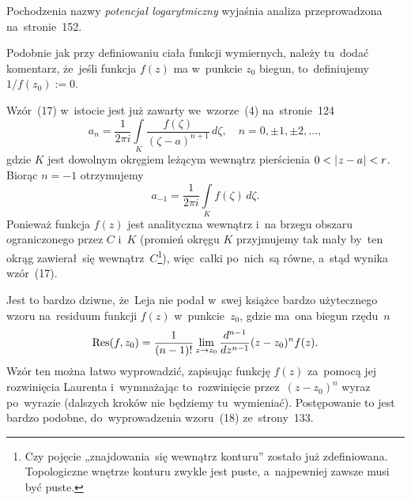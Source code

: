 \documentclass[a4paper,11pt]{article}
\numberwithin{equation}{section}
\begin{document}
\noindent
{} Pochodzenia nazwy \textit{potencjał logarytmiczny} wyjaśnia
analiza przeprowadzona na~stronie~152.

\VerSpaceFour





\noindent
{} Podobnie jak przy definiowaniu ciała funkcji wymiernych, należy
tu~dodać komentarz, że~jeśli funkcja $f( z )$ ma w~punkcie $z_{ 0 }$
biegun, to~definiujemy $1 / f( z_{ 0 } ) := 0$.

\VerSpaceFour





\noindent
{} Wzór~(17) w~istocie jest już zawarty we~wzorze~(4) na~stronie~124
\begin{equation}
  \label{eq:Leja-Funkcje-zespolone-46}
  a_{ n } =
  \frac{ 1 }{ 2\pi i }
  \int\limits_{ K } \frac{ f( \zeta ) }{ ( \zeta - a )^{ n + 1 } } \, d\zeta,
  \quad n = 0, \pm 1, \pm 2, \ldots,
\end{equation}
gdzie $K$ jest dowolnym okręgiem leżącym wewnątrz pierścienia
$0 < | \hspace{0.05em}  z - a  \hspace{0.05em} | < r$. Biorąc $n = -1$ otrzymujemy
\begin{equation}
  \label{eq:Leja-Funkcje-zespolone-47}
  a_{ -1 } = \frac{ 1 }{ 2\pi i } \int\limits_{ K } f( \zeta ) \, d\zeta.
\end{equation}
Ponieważ funkcja $f( z )$ jest analityczna wewnątrz i~na brzegu
obszaru ograniczonego przez $C$ i~$K$ (promień okręgu $K$ przyjmujemy
tak mały by~ten okrąg zawierał~się wewnątrz~$C$\footnote{Czy pojęcie
  „znajdowania~się wewnątrz konturu” zostało już zdefiniowana.
  Topologiczne wnętrze konturu zwykle jest puste, a~najpewniej zawsze
  musi być puste.}), więc~całki po~nich~są równe, a~stąd wynika
wzór~(17).

\VerSpaceFour





\noindent
{} Jest to bardzo dziwne, że~Leja nie podał w~swej książce bardzo
użytecznego wzoru na~residuum funkcji $f( z )$ w~punkcie~$z_{ 0 }$, gdzie
ma~ona biegun rzędu~$n$
\begin{equation}
  \label{eq:Leja-Funkcje-zespolone-48}
  \operatorname{Res}( f, z_{ 0 } ) =
  \frac{ 1 }{ ( n - 1 )! }
  \lim\limits_{ z \to z_{ 0 } }
  \frac{ d^{ n - 1 } }{ dz^{ n - 1 } } ( z - z_{ 0 } )^{ n } f( z ).
\end{equation}
Wzór ten można łatwo wyprowadzić, zapisując funkcję $f( z )$ za~pomocą
jej rozwinięcia Laurenta i~wymnażając to~rozwinięcie
przez~$( z - z_{ 0 } )^{ n }$ wyraz po~wyrazie (dalszych kroków nie
będziemy tu~wymieniać). Postępowanie to jest bardzo podobne,
do~wyprowadzenia wzoru~(18) ze~strony~133.
\end{document}
